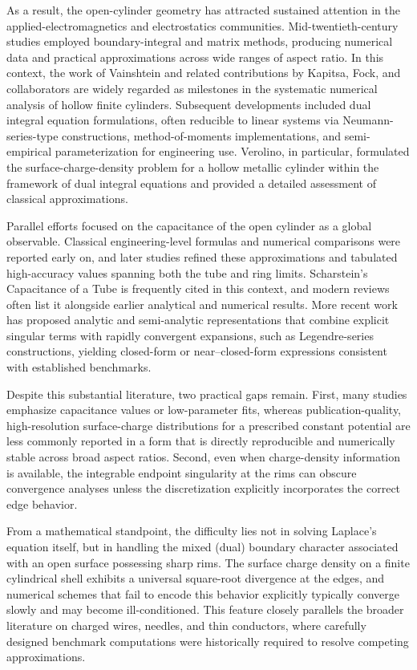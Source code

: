 \documentclass[12pt]{article}
\begin{document}
As a result, the open-cylinder geometry has attracted sustained attention in
the applied-electromagnetics and electrostatics communities.
Mid-twentieth-century studies employed boundary-integral and matrix methods,
producing numerical data and practical approximations across wide ranges of
aspect ratio. In this context, the work of Vainshtein and related
contributions by Kapitsa, Fock, and collaborators\cite{c2a,c2b,c2c} are widely
regarded as milestones in the systematic numerical analysis of hollow finite
cylinders\cite{c3}. Subsequent developments included dual integral equation
formulations, often reducible to linear systems via Neumann-series-type
constructions, method-of-moments implementations, and semi-empirical
parameterization for engineering use. Verolino, in particular, formulated the
surface-charge-density problem for a hollow metallic cylinder within the
framework of dual integral equations and provided a detailed assessment of
classical approximations\cite{c4}.

Parallel efforts focused on the capacitance of the open cylinder as a global
observable. Classical engineering-level formulas and numerical comparisons
were reported early on, and later studies refined these approximations and
tabulated high-accuracy values spanning both the tube and ring limits.
Scharstein's Capacitance of a Tube is frequently cited in this context, and
modern reviews often list it alongside earlier analytical and numerical
results\cite{c5}. More recent work has proposed analytic and semi-analytic
representations that combine explicit singular terms with rapidly convergent
expansions, such as Legendre-series constructions, yielding closed-form or
near--closed-form expressions consistent with established
benchmarks\cite{c6,exp1,exp2,exp3,exp4,exp5,exp6,exp7,exp8}.

Despite this substantial literature, two practical gaps remain. First, many
studies emphasize capacitance values or low-parameter fits, whereas
publication-quality, high-resolution surface-charge distributions for a
prescribed constant potential are less commonly reported in a form that is
directly reproducible and numerically stable across broad aspect ratios.
Second, even when charge-density information is available, the integrable
endpoint singularity at the rims can obscure convergence analyses unless the
discretization explicitly incorporates the correct edge behavior.

From a mathematical standpoint, the difficulty lies not in solving Laplace's
equation itself, but in handling the mixed (dual) boundary character
associated with an open surface possessing sharp rims. The surface charge
density on a finite cylindrical shell exhibits a universal square-root
divergence at the edges, and numerical schemes that fail to encode this
behavior explicitly typically converge slowly and may become ill-conditioned.
This feature closely parallels the broader literature on charged wires,
needles, and thin conductors, where carefully designed benchmark computations
were historically required to resolve competing approximations.
\end{document}
